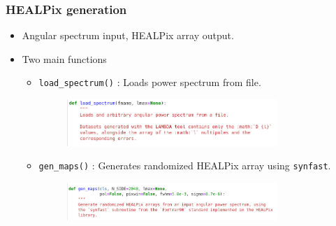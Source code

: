 \begin{frame}
\frametitle{HEALPix generation}

\begin{itemize}
	\item<1-> Angular spectrum input, HEALPix array output.
	\item<2-> Two main functions
	\begin{itemize}
		\item<2-> \texttt{load\_spectrum()} : Loads power spectrum from file.
		\begin{figure}
			\includegraphics[width=0.8\textwidth]{./images/load_spectrum.png}
		\end{figure}
		\item<2-> \texttt{gen\_maps()} : Generates randomized HEALPix array using \texttt{synfast}.
		\begin{figure}
			\includegraphics[width=0.8\textwidth]{./images/gen_maps.png}
		\end{figure}
	\end{itemize}
\end{itemize}

\end{frame}